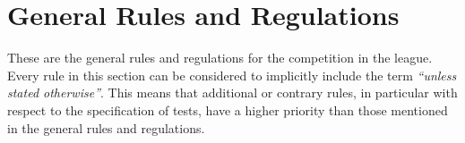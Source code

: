 \chapter{General Rules and Regulations}
\label{chap:rules}

These are the general rules and regulations for the competition in the \RoboCup\AtHome{} league.
Every rule in this section can be considered to implicitly include the term \emph{\enquote{unless stated otherwise}}.
This means that additional or contrary rules, in particular with respect to the specification of tests, have a higher priority than those mentioned in the general rules and regulations.



















